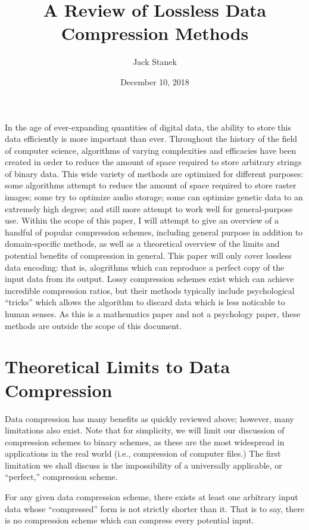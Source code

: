 \documentclass[12pt]{article}
\title{A Review of Lossless Data Compression Methods}
\author{Jack Stanek}
\date{December 10, 2018}
\begin{document}
\maketitle

In the age of ever-expanding quantities of digital data, the ability
to store this data efficiently is more important than ever. Throughout
the history of the field of computer science, algorithms of varying
complexities and efficacies have been created in order to reduce the
amount of space required to store arbitrary strings of binary
data. This wide variety of methods are optimized for different
purposes: some algorithms attempt to reduce the amount of space
required to store raster images; some try to optimize audio storage;
some can optimize genetic data to an extremely high degree; and still
more attempt to work well for general-purpose use. Within the scope of
this paper, I will attempt to give an overview of a handful of popular
compression schemes, including general purpose in addition to
domain-specific methods, as well as a theoretical overview of the
limits and potential benefits of compression in general. This paper
will only cover lossless data encoding: that is, alogrithms which can
reproduce a perfect copy of the input data from its output. Lossy
compression schemes exist which can achieve incredible compression
ratios, but their methods typically include psychological ``tricks''
which allows the algorithm to discard data which is less noticable to
human senses. As this is a mathematics paper and not a psychology
paper, these methods are outside the scope of this document.

\section{Theoretical Limits to Data Compression}

Data compression has many benefits as quickly reviewed above; however,
many limitations also exist. Note that for simplicity, we will limit
our discussion of compression schemes to binary schemes, as these are
the most widespread in applications in the real world (i.e.,
compression of computer files.) The first limitation we shall discuss
is the impossibility of a universally applicable, or ``perfect,''
compression scheme.

\begin{Theorem}
  \label{imperfect-compression}
  For any given data compression scheme, there exists at least one
  arbitrary input data whose ``compressed'' form is not strictly
  shorter than it. That is to say, there is no compression scheme
  which can compress every potential input.
\end{Theorem}
\end{document}
